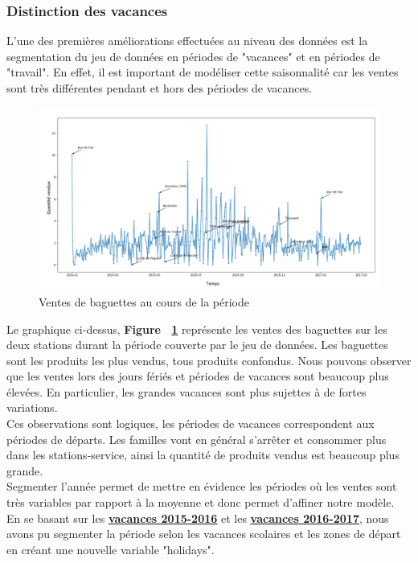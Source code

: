\documentclass{article} %
\begin{document}
\subsubsection{Distinction des vacances}
L'une des premières améliorations effectuées au niveau des données est la segmentation du jeu de données en périodes de "vacances" et en périodes de "travail". En effet, il est important de modéliser cette saisonnalité car les ventes sont très différentes pendant et hors des périodes de vacances. 
\begin{figure}[!h]
	\centering
	\includegraphics[keepaspectratio = true,scale=0.65]{varvente.png}
	\caption{Ventes de baguettes au cours de la période}
	\label{bbg}
\end{figure}
Le graphique ci-dessus, \textbf{Figure ~\ref{bbg}} représente les ventes des baguettes sur les deux stations durant la période couverte par le jeu de données. Les baguettes sont les produits les plus vendus, tous produits confondus. Nous pouvons observer que les ventes lors des jours fériés et périodes de vacances sont beaucoup plus élevées. En particulier, les grandes vacances sont plus sujettes à de fortes variations.\\
Ces observations sont logiques, les périodes de vacances correspondent aux périodes de départs. Les familles vont en général s'arrêter et consommer plus dans les stations-service, ainsi la quantité de produits vendus est beaucoup plus grande.\\
Segmenter l'année permet de mettre en évidence les périodes où les ventes sont très variables par rapport à la moyenne et donc permet d'affiner notre modèle. En se basant sur les \href{https://vacances-scolaires.education/annee-2015-2016.php}{\underline{\textbf{\textcolor[rgb]{0,0,1}{vacances 2015-2016}}}} et les \href{https://vacances-scolaires.education/annee-2016-2017.php}{\underline{\textbf{\textcolor[rgb]{0,0,1}{vacances 2016-2017}}}}, nous avons pu segmenter la période selon les vacances scolaires et les zones de départ en créant une nouvelle variable "holidays".
\end{document}
